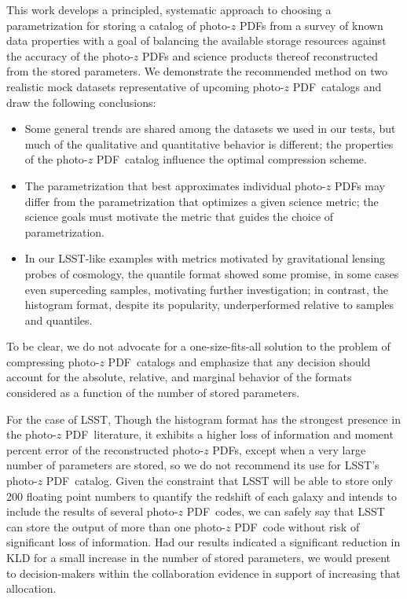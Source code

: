 \documentclass[\docopts]{\docclass}
\newcommand{\pz}{photo-$z$ PDF}
\begin{document}
This work develops a principled, systematic approach to choosing a 
parametrization for storing a catalog of \pz s from a survey of known data 
properties with a goal of balancing the available storage resources against the 
accuracy of the \pz s and science products thereof reconstructed from the 
stored parameters.
We demonstrate the recommended method on two realistic mock datasets 
representative of upcoming \pz\ catalogs and draw the following conclusions:
\begin{itemize}
  \item Some general trends are shared among the datasets we used in our tests, 
but much of the qualitative and quantitative behavior is different; the 
properties of the \pz\ catalog influence the optimal compression scheme.
  \item The parametrization that best approximates individual \pz s may differ 
from the parametrization that optimizes a given science metric; the science 
goals must motivate the metric that guides the choice of parametrization.
  \item In our LSST-like examples with metrics motivated by gravitational 
lensing probes of cosmology, the quantile format showed some promise, in some 
cases even superceding samples, motivating further investigation; in contrast, 
the histogram format, despite its popularity, underperformed relative to 
samples and quantiles.
\end{itemize}
To be clear, we do not advocate for a one-size-fits-all solution to the problem 
of compressing \pz\ catalogs and emphasize that any decision should account for 
the absolute, relative, and marginal behavior of the formats considered as a 
function of the number of stored parameters.

For the case of LSST, Though the histogram format has the strongest presence in 
the \pz\ literature, it exhibits a higher loss of information and moment 
percent error of the reconstructed \pz s, except when a very large number of 
parameters are stored, so we do not recommend its use for LSST's \pz\ catalog.
Given the constraint that LSST will be able to store only 200 floating point 
numbers to quantify the redshift of each galaxy and intends to include the 
results of several \pz\ codes, we can safely say that LSST can store the output 
of more than one \pz\ code without risk of significant loss of information.
Had our results indicated a significant reduction in KLD for a small increase 
in the number of stored parameters, we would present to decision-makers within 
the collaboration evidence in support of increasing that allocation.
\end{document}

